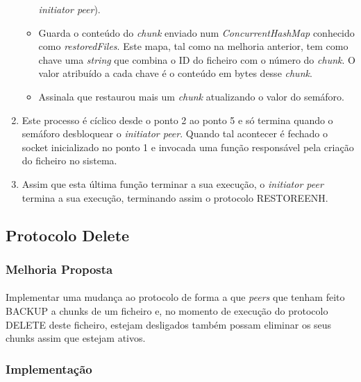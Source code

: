 \documentclass[11pt,oneside]{book}
\begin{document}
\begin{enumerate}
\begin{itemize}
            \textit{initiator peer}).
            \item Guarda o conteúdo do \textit{chunk} enviado num \textit{ConcurrentHashMap} conhecido
            como \textit{restoredFiles}. Este mapa, tal como na melhoria anterior, 
            tem como chave uma \textit{string} que combina o ID do ficheiro com
            o número do \textit{chunk}. O valor atribuído a cada chave é o 
            conteúdo em bytes desse \textit{chunk}.
            \item Assinala que restaurou mais um \textit{chunk} atualizando o 
            valor do semáforo.
        \end{itemize}
        \item Este processo é cíclico desde o ponto 2 ao ponto 5 e só termina quando
        o semáforo desbloquear o \textit{initiator peer}. Quando tal acontecer é
        fechado o socket inicializado no ponto 1 e invocada uma função responsável
        pela criação do ficheiro no sistema.
        \item Assim que esta última função terminar a sua execução, o 
        \textit{initiator peer} termina a sua execução, terminando assim o protocolo
        RESTOREENH.
    \end{enumerate}



\pagebreak

\subsection{Protocolo Delete}

\subsubsection{Melhoria Proposta}
\paragraph{}
Implementar uma mudança ao protocolo de forma a que \textit{peers} que tenham
feito BACKUP a chunks de um ficheiro e, no momento de execução do protocolo 
DELETE deste ficheiro, estejam desligados também possam eliminar os seus chunks 
assim que estejam ativos.

\subsubsection{Implementação}
\end{document}
